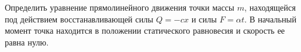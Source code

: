 Определить уравнение прямолинейного движения точки массы $m$, находящейся
под действием восстанавливающей силы $Q=-cx$ и силы $F=\alpha t$. В начальный
момент точка находится в положении статического равновесия и скорость ее
равна нулю.
